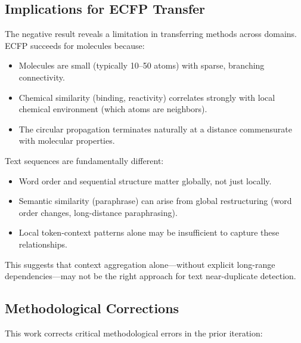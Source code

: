 \documentclass[11pt,letterpaper]{article}
\begin{document}
\subsection{Implications for ECFP Transfer}

The negative result reveals a limitation in transferring methods across domains. ECFP succeeds for molecules because:
\begin{itemize}
  \item Molecules are small (typically 10--50 atoms) with sparse, branching connectivity.
  \item Chemical similarity (binding, reactivity) correlates strongly with local chemical environment (which atoms are neighbors).
  \item The circular propagation terminates naturally at a distance commensurate with molecular properties.
\end{itemize}

Text sequences are fundamentally different:
\begin{itemize}
  \item Word order and sequential structure matter globally, not just locally.
  \item Semantic similarity (paraphrase) can arise from global restructuring (word order changes, long-distance paraphrasing).
  \item Local token-context patterns alone may be insufficient to capture these relationships.
\end{itemize}

This suggests that context aggregation alone---without explicit long-range dependencies---may not be the right approach for text near-duplicate detection.

\subsection{Methodological Corrections}

This work corrects critical methodological errors in the prior iteration:
\end{document}
